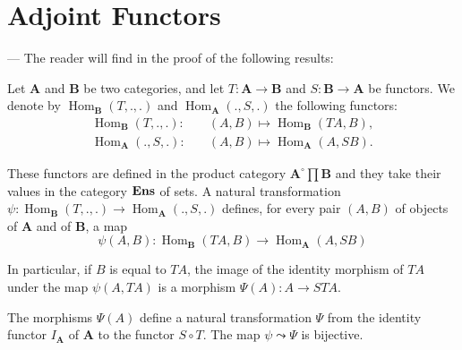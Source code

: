
\section{Adjoint Functors}
--- The reader will find in \cite{shih} the proof of the following results:

Let $\mathbf{A}$ and $\mathbf{B}$ be two categories, and let
$T\colon \mathbf{A}\to\mathbf{B}$ and $S\colon \mathbf{B}\to\mathbf{A}$
be functors. We denote by $\operatorname{Hom}_{\mathbf{B}}(T,.,.)$ and
$\operatorname{Hom}_{\mathbf{A}}(.,S,.)$ the following functors:
\[
  \begin{aligned}
  \operatorname{Hom}_{\mathbf{B}}(T,.,.)\colon\quad
    &(A,B)\mapsto\operatorname{Hom}_{\mathbf{B}}(TA,B),\\
  \operatorname{Hom}_{\mathbf{A}}(.,S,.)\colon\quad
    &(A,B)\mapsto\operatorname{Hom}_{\mathbf{A}}(A,SB).
  \end{aligned}
\]

These functors are defined in the product category
$\mathbf{A}^{\circ}\prod\mathbf{B}$ and they take their values in the
category $\mathbf{Ens}$ of sets. A natural transformation
$\psi\colon\operatorname{Hom}_{\mathbf{B}}(T,.,.)\to
\operatorname{Hom}_{\mathbf{A}}(.,S,.)$ defines, for every pair $(A,B)$ of
objects of $\mathbf{A}$ and of $\mathbf{B}$, a map
\[
  \psi(A,B)\colon
  \operatorname{Hom}_{\mathbf{B}}(TA,B)\longrightarrow
  \operatorname{Hom}_{\mathbf{A}}(A,SB)
\]

In particular, if $B$ is equal to $TA$, the image of the identity morphism
of $TA$ under the map $\psi(A,TA)$ is a morphism
$\Psi(A)\colon A\to STA$.

\begin{lemma}
The morphisms $\Psi(A)$ define a natural transformation $\Psi$ from the
identity functor $I_{\mathbf{A}}$ of $\mathbf{A}$ to the functor
$S\circ T$. The map $\psi\leadsto\Psi$ is bijective.
\end{lemma}

